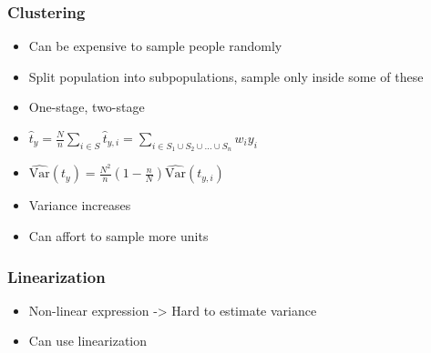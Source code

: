 \documentclass{beamer}
\begin{document}
\begin{frame}
  \frametitle{Clustering}

  \begin{itemize}
  \addtolength{\itemsep}{0.5\baselineskip}
  \item Can be expensive to sample people randomly
  \item Split population into subpopulations, sample only inside some of these
  \item One-stage, two-stage
  \item \(\hat{t}_y = \frac{N}{n} \sum_{i \in S} \hat{t}_{y, i} = \sum_{i \in
      S_1 \cup S_2 \cup \dots \cup S_n} w_i y_i\)
  \item \(\widehat{\mathrm{Var}}\left(t_{y}\right) = \frac{N^2}{n} \left( 1 - \frac{n}{N}
\right) \widehat{\mathrm{Var}}\left( t_{y, i} \right)\)
  \item Variance increases
  \item Can affort to sample more units
  \end{itemize}
  
\end{frame}

\begin{frame}
  \frametitle{Linearization}

  \begin{itemize}
  \addtolength{\itemsep}{0.5\baselineskip}

\item Non-linear expression -> Hard to estimate variance %
  \item Can use linearization
  \end{itemize}

\end{frame}

\end{document}
